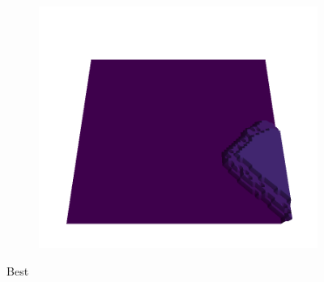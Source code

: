 \begin{figure}[H]
    \begin{subfigure}[b]{0.19\textwidth}
        \includegraphics[width=\linewidth]{../img/5/quarry/best//patch-3d-majavi-colormap-4.png}
    \end{subfigure}  

\caption{Best}    
\end{figure}


